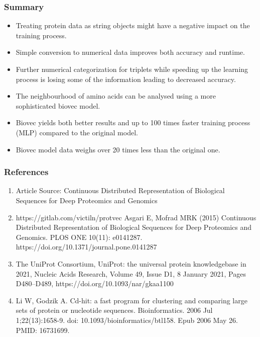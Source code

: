 \documentclass[10pt]{beamer}
\begin{document}
\begin{frame}
\frametitle{Summary}
\begin{itemize}
\item Treating protein data as string objects might have a negative impact on the training process.
\item Simple conversion to numerical data improves both accuracy  and runtime.
\item Further numerical categorization for triplets while speeding up the learning process is losing some of the information leading to decreased accuracy.
\item The neighbourhood of amino acids can be analysed using a more sophisticated biovec model.
\item Biovec yields both better results and up to 100 times faster training process (MLP) compared to the original model.
\item Biovec model data weighs over 20 times less than the original one.
\end{itemize}
\end{frame}

\begin{frame}
\frametitle{References}
\begin{footnotesize}
\begin{enumerate}
\item Article Source: Continuous Distributed Representation of Biological Sequences for Deep Proteomics and Genomics
\item https://gitlab.com/victiln/protvec
Asgari E, Mofrad MRK (2015) Continuous Distributed Representation of Biological Sequences for Deep Proteomics and Genomics. PLOS ONE 10(11): e0141287. https://doi.org/10.1371/journal.pone.0141287
\item The UniProt Consortium, UniProt: the universal protein knowledgebase in 2021, Nucleic Acids Research, Volume 49, Issue D1, 8 January 2021, Pages D480–D489, https://doi.org/10.1093/nar/gkaa1100
\item Li W, Godzik A. Cd-hit: a fast program for clustering and comparing large sets of protein or nucleotide sequences. Bioinformatics. 2006 Jul 1;22(13):1658-9. doi: 10.1093/bioinformatics/btl158. Epub 2006 May 26. PMID: 16731699.
\end{enumerate}
\end{footnotesize}
\end{frame}
\end{document}
